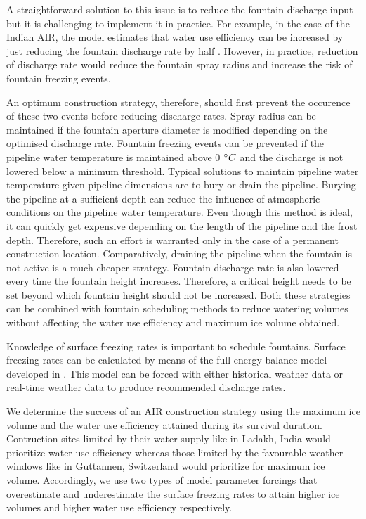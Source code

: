 \documentclass[tc, manuscript]{copernicus}
\begin{document}
A straightforward solution to this issue is to reduce the fountain discharge input but it is challenging to
implement it in practice. For example, in the case of the Indian AIR, the model estimates that water use
efficiency can be increased by just reducing the fountain discharge rate by half
\citep{balasubramanianInfluenceMeteorologicalConditions2022}. However, in practice, reduction of discharge rate
would reduce the fountain spray radius and increase the risk of fountain freezing events.  

An optimum construction strategy, therefore, should first prevent the occurence of these two events before
reducing discharge rates. Spray radius can be maintained if the fountain aperture diameter is modified depending
on the optimised discharge rate. Fountain freezing events can be prevented if the pipeline water temperature is
maintained above 0 $^{\circ} C$ and the discharge is not lowered below a minimum threshold. Typical solutions to
maintain pipeline water temperature given pipeline dimensions are to bury or drain the pipeline. Burying the
pipeline at a sufficient depth can reduce the influence of atmospheric conditions on the pipeline water
temperature. Even though this method is ideal, it can quickly get expensive depending on the length of the
pipeline and the frost depth. Therefore, such an effort is warranted only in the case of a permanent
construction location. Comparatively, draining the pipeline when the fountain is not active is a much cheaper
strategy. Fountain discharge rate is also lowered every time the fountain height increases. Therefore, a
critical height needs to be set beyond which fountain height should not be increased. Both these strategies can
be combined with fountain scheduling methods to reduce watering volumes without affecting the water use
efficiency and maximum ice volume obtained. 

Knowledge of surface freezing rates is important to schedule fountains. Surface freezing rates can be
calculated by means of the full energy balance model developed in
\cite{balasubramanianInfluenceMeteorologicalConditions2022}. This model can be forced with either historical
weather data or real-time weather data to produce recommended discharge rates.

We determine the success of an AIR construction strategy using the maximum ice volume and the water use
efficiency attained during its survival duration. Contruction sites limited by their water supply like in
Ladakh, India would prioritize water use efficiency whereas those limited by the favourable weather windows like
in Guttannen, Switzerland  would  prioritize for maximum ice volume. Accordingly, we use two types of model
parameter forcings that overestimate and underestimate the surface freezing rates to attain higher ice volumes
and higher water use efficiency respectively. 
\end{document}
